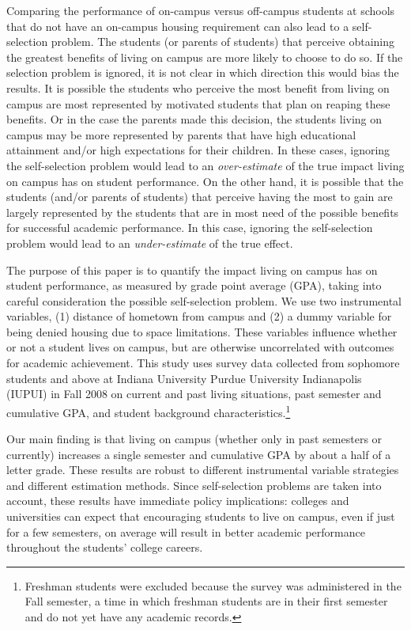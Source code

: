 \documentclass[12pt]{article}
\begin{document}
Comparing the performance of on-campus versus off-campus students at schools that do not have an on-campus housing requirement can also lead to a self-selection problem.  The students (or parents of students) that perceive obtaining the greatest benefits of living on campus are more likely to choose to do so.  If the selection problem is ignored, it is not clear in which direction this would bias the results.  It is possible the students who perceive the most benefit from living on campus are most represented by motivated students that plan on reaping these benefits.  Or in the case the parents made this decision, the students living on campus may be more represented by parents that have high educational attainment and/or high expectations for their children.  In these cases, ignoring the self-selection problem would lead to an \textit{over-estimate} of the true impact living on campus has on student performance.  On the other hand, it is possible that the students (and/or parents of students) that perceive having the most to gain are largely represented by the students that are in most need of the possible benefits for successful academic performance.  In this case, ignoring the self-selection problem would lead to an \textit{under-estimate} of the true effect.

The purpose of this paper is to quantify the impact living on campus has on student performance, as measured by grade point average (GPA), taking into careful consideration the possible self-selection problem.  We use two instrumental variables, (1) distance of hometown from campus and (2) a dummy variable for being denied housing due to space limitations.  These variables influence whether or not a student lives on campus, but are otherwise uncorrelated with outcomes for academic achievement.  This study uses survey data collected from sophomore students and above at Indiana University Purdue University Indianapolis (IUPUI) in Fall 2008 on current and past living situations, past semester and cumulative GPA, and student background characteristics.\footnote{Freshman students were excluded because the survey was administered in the Fall semester, a time in which freshman students are in their first semester and do not yet have any academic records.}

Our main finding is that living on campus (whether only in past semesters or currently) increases a single semester and cumulative GPA by about a half of a letter grade. These results are robust to different instrumental variable strategies and different estimation methods.  Since self-selection problems are taken into account, these results have immediate policy implications: colleges and universities can expect that encouraging students to live on campus, even if just for a few semesters, on average will result in better academic performance throughout the students' college careers.
\end{document}
